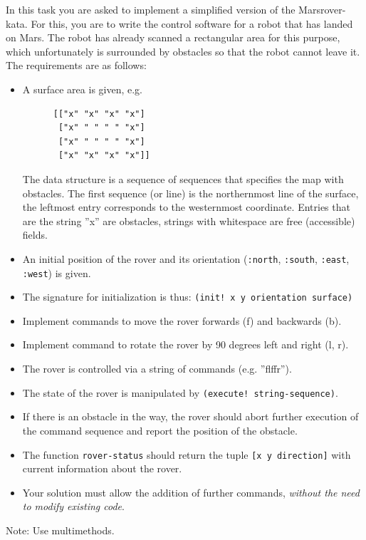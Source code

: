 \documentclass[11pt,a4paper]{article}
\begin{document}
\begin{exercise}[Marsrover]
	In this task you are asked to implement a simplified version of the Marsrover-kata.
	For this, you are to write the control software for a robot that has landed on Mars.
	The robot has already scanned a rectangular area for this purpose, which unfortunately is surrounded by obstacles so that the robot cannot leave it.
	The requirements are as follows:

\begin{itemize}
    \item A surface area is given, e.g.
        \begin{verbatim}
      [["x" "x" "x" "x"]
       ["x" " " " " "x"]
       ["x" " " " " "x"]
       ["x" "x" "x" "x"]]
\end{verbatim}

	The data structure is a sequence of sequences that specifies the map with obstacles.
  	The first sequence (or line) is the northernmost line of the surface, the leftmost entry corresponds to the westernmost coordinate.
  	Entries that are the string ''x'' are obstacles, strings with whitespace are free (accessible) fields.
    \item An initial position of the rover and its orientation (\verb|:north|, \verb|:south|, \verb|:east|, \verb|:west|) is given.
    \item The signature for initialization is thus: \verb|(init! x y orientation surface)|
    \item Implement commands to move the rover forwards (f) and backwards (b).
    \item Implement command to rotate the rover by 90 degrees left and right (l, r).
    \item The rover is controlled via a string of commands (e.g. ''flffr'').
    \item The state of the rover is manipulated by \verb|(execute! string-sequence)|.
    \item If there is an obstacle in the way, the rover should abort further execution of the command sequence and report the position of the obstacle.
    \item The function \verb|rover-status| should return the tuple \verb|[x y direction]| with current information about the rover.
    \item Your solution must allow the addition of further commands,
        \emph{without the need to modify existing code}.
\end{itemize}

        Note: Use multimethods.
\end{exercise}
\end{document}
